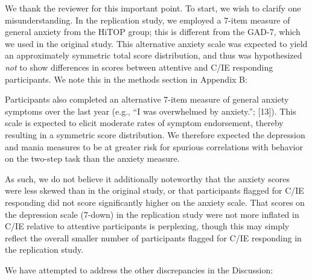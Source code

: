 \documentclass[a4paper,notitlepage,12pt]{article}
\begin{document}
We thank the reviewer for this important point. To start, we wish to clarify one misunderstanding. In the replication study, we employed a 7-item measure of general anxiety from the HiTOP group; this is different from the GAD-7, which we used in the original study. This alternative anxiety scale was expected to yield an approximately symmetric total score distribution, and thus was hypothesized \emph{not} to show differences in scores between attentive and C/IE responding participants. We note this in the methods section in Appendix B:  

\begin{displayquote}
    Participants also completed an alternative 7-item measure of general anxiety symptoms over the last year (e.g., ``I was overwhelmed by anxiety.''; [13]). This scale is expected to elicit moderate rates of symptom endorsement, thereby resulting in a symmetric score distribution. We therefore expected the depression and mania measures to be at greater risk for spurious correlations with behavior on the two-step task than the anxiety measure.
\end{displayquote}

As such, we do not believe it additionally noteworthy that the anxiety scores were less skewed than in the original study, or that participants flagged for C/IE responding did not score significantly higher on the anxiety scale. That scores on the depression scale (7-down) in the replication study were not more inflated in C/IE relative to attentive participants is perplexing, though this may simply reflect the overall smaller number of participants flagged for C/IE responding in the replication study.

We have attempted to address the other discrepancies in the Discussion:
\end{document}
